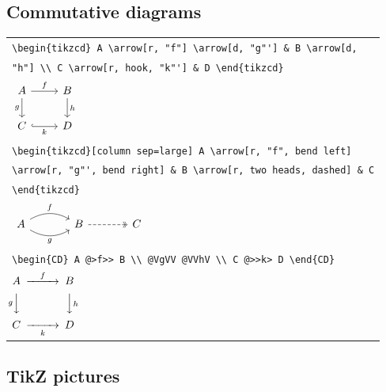 \documentclass[9pt]{extarticle}
\begin{document}
\subsection*{Commutative diagrams}

\begin{tabular}{@{}l@{}}
{\small\verb|\begin{tikzcd} A \arrow[r, "f"] \arrow[d, "g"'] & B \arrow[d,|} \\ {\small\verb|"h"] \\ C \arrow[r, hook, "k"'] & D \end{tikzcd}|} \\ {\large $\begin{tikzcd} A \arrow[r, "f"] \arrow[d, "g"'] & B \arrow[d, "h"] \\ C \arrow[r, hook, "k"'] & D \end{tikzcd}
$} \\[4pt]
{\small\verb|\begin{tikzcd}[column sep=large] A \arrow[r, "f", bend left]|} \\ {\small\verb|\arrow[r, "g"', bend right] & B \arrow[r, two heads, dashed] & C|} \\ {\small\verb|\end{tikzcd}|} \\ {\large $\begin{tikzcd}[column sep=large] A \arrow[r, "f", bend left] \arrow[r, "g"', bend right] & B \arrow[r, two heads, dashed] & C \end{tikzcd}
$} \\[4pt]
{\small\verb|\begin{CD} A @>f>> B \\ @VgVV @VVhV \\ C @>>k> D \end{CD}|} \\ {\large $\begin{CD} A @>f>> B \\ @VgVV @VVhV \\ C @>>k> D \end{CD}
$} \\[4pt]
\end{tabular}

\subsection*{TikZ pictures}
\end{document}
